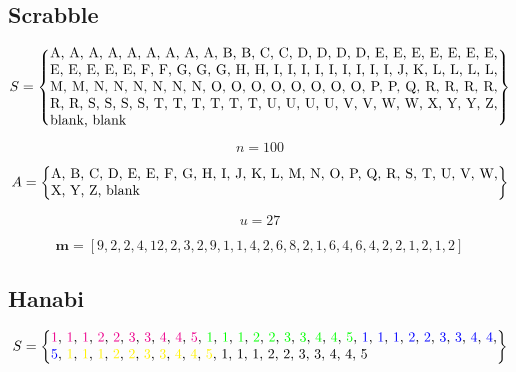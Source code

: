 \documentclass{article}
\begin{document}
\subsection{Scrabble}

\begin{equation}\nonumber
    S = \left \{
    \parbox{32em}{A, A, A, A, A, A, A, A, A, B, B, C, C, D, D, D, D, E, E, E, E, E, E, E, E, E, E, E, E, F, F, G, G, G, H, H, I, I, I, I, I, I, I, I, I, J, K, L, L, L, L, M, M, N, N, N, N, N, N, O, O, O, O, O, O, O, O, P, P, Q, R, R, R, R, R, R, S, S, S, S, T, T, T, T, T, T, U, U, U, U, V, V, W, W, X, Y, Y, Z, blank, blank}\right \}
\end{equation}

\begin{equation}\nonumber
    n = 100
\end{equation}

\begin{equation}\nonumber
    A = \left \{
    \parbox{32em}{A, B, C, D, E, E, F, G, H, I, J, K, L, M, N, O, P, Q, R, S, T, U, V, W, X, Y, Z, blank}\right \}
\end{equation}

\begin{equation}\nonumber
    u = 27
\end{equation}

\begin{equation}\nonumber
    \bm{m} = [9, 2, 2, 4, 12, 2, 3, 2, 9, 1, 1, 4, 2, 6, 8, 2, 1, 6, 4, 6, 4, 2, 2, 1, 2, 1, 2]
\end{equation}

\subsection{Hanabi}

\begin{equation}\nonumber
    S = \left \{\\
    \parbox{32em}{
     \color{magenta}1\color{black}, \color{magenta}1\color{black}, \color{magenta}1\color{black}, \color{magenta}2\color{black}, \color{magenta}2\color{black}, \color{magenta}3\color{black}, \color{magenta}3\color{black}, \color{magenta}4\color{black}, \color{magenta}4\color{black}, \color{magenta}5\color{black}, \color{green}1\color{black}, \color{green}1\color{black}, \color{green}1\color{black}, \color{green}2\color{black}, \color{green}2\color{black}, \color{green}3\color{black}, \color{green}3\color{black}, \color{green}4\color{black}, \color{green}4\color{black}, \color{green}5\color{black}, \color{blue}1\color{black}, \color{blue}1\color{black}, \color{blue}1\color{black}, \color{blue}2\color{black}, \color{blue}2\color{black}, \color{blue}3\color{black}, \color{blue}3\color{black}, \color{blue}4\color{black}, \color{blue}4\color{black}, \color{blue}5\color{black}, \color{yellow}1\color{black}, \color{yellow}1\color{black}, \color{yellow}1\color{black}, \color{yellow}2\color{black}, \color{yellow}2\color{black}, \color{yellow}3\color{black}, \color{yellow}3\color{black}, \color{yellow}4\color{black}, \color{yellow}4\color{black}, \color{yellow}5\color{black}, 1, 1, 1, 2, 2, 3, 3, 4, 4, 5
     }\right \}
\end{equation}
\end{document}
